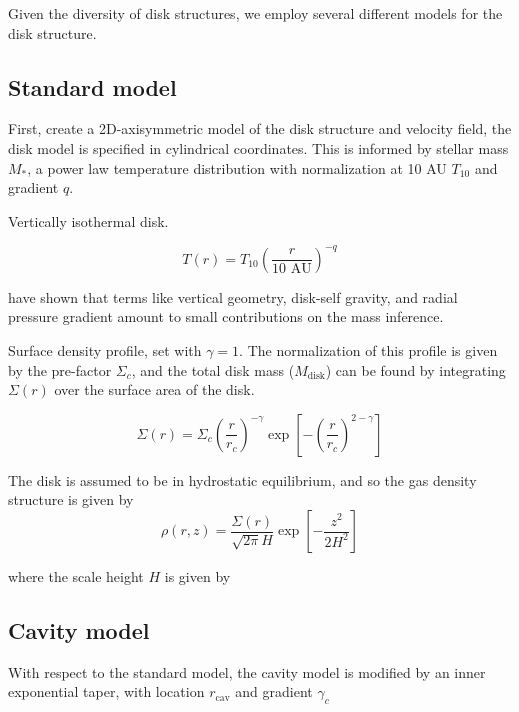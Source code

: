 \documentclass{aastex6}
\begin{document}

Given the diversity of disk structures, we employ several different models for the disk structure.

\subsection{Standard model}


First, create a 2D-axisymmetric model of the disk structure and velocity field, the disk model is specified in cylindrical coordinates. This is informed by stellar mass $M_\ast$, a power law temperature distribution with normalization at 10 AU $T_{10}$ and gradient $q$.

Vertically isothermal disk.

\begin{equation}
	T(r) = T_{10} \left ( \frac{r}{\textrm{10 AU}}\right)^{-q}
\end{equation}

\citet{rosenfeld13a} have shown that terms like vertical geometry, disk-self gravity, and radial pressure gradient amount to small contributions on the mass inference.

Surface density profile, set with $\gamma = 1$. The normalization of this profile is given by the pre-factor $\Sigma_c$, and the total disk mass ($M_\textrm{disk}$) can be found by integrating $\Sigma(r)$ over the surface area of the disk.

\begin{equation}
\Sigma(r) = \Sigma_c \left (\frac{r}{r_c} \right)^{- \gamma} \exp \left[ - \left(\frac{r}{r_c} \right)^{2 - \gamma} \right]
\end{equation}

The disk is assumed to be in hydrostatic equilibrium, and so the gas density structure is given by
\begin{equation}
\rho(r, z) = \frac{\Sigma(r)}{\sqrt{2 \pi} H} \exp \left [- \frac{z^2}{2 H^2} \right]
\end{equation}

where the scale height $H$ is given by

\subsection{Cavity model}

With respect to the standard model, the cavity model is modified by an inner exponential taper, with location $r_\textrm{cav}$ and gradient $\gamma_c$
\end{document}

